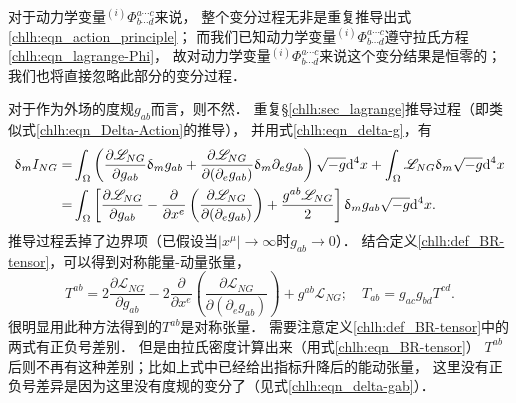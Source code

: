 对于动力学变量${}^{(i)}\Phi^{a\cdots c}_{b\cdots d}$来说，
整个变分过程无非是重复推导出式\eqref{chlh:eqn_action_principle}；
而我们已知动力学变量${}^{(i)}\Phi^{a\cdots c}_{b\cdots d}$遵守拉氏方程\eqref{chlh:eqn_lagrange-Phi}，
故对动力学变量${}^{(i)}\Phi^{a\cdots c}_{b\cdots d}$来说这个变分结果是恒零的；
我们也将直接忽略此部分的变分过程．


对于作为外场的度规$g_{ab}$而言，则不然．
重复\S\ref{chlh:sec_lagrange}推导过程（即类似式\eqref{chlh:eqn_Delta-Action}的推导），
并用式\eqref{chlh:eqn_delta-g}，有
\setlength{\mathindent}{0em}
\begin{align}
    \updelta_{m} I_{NG} =& \int_\Omega
    \left( \frac{\partial \mathscr{L}_{NG}}{\partial g_{ab}} \updelta_{m} g_{ab}
    + \frac{\partial \mathscr{L}_{NG}}{\partial (\partial_e g_{ab})}
    \updelta_m \partial_e  g_{ab} \right) \sqrt{-g} {\rm d}^{4}x
    +\int_\Omega \mathscr{L}_{NG} \updelta_{m} \sqrt{-g} {\rm d}^{4}x \notag \\
    =& \int_\Omega
    \left[ \frac{\partial \mathscr{L}_{NG}}{\partial g_{ab}}
    - \frac{\partial }{\partial x^e} \left(
    \frac{\partial \mathscr{L}_{NG}}{\partial (\partial_e g_{ab})}  \right)
     + \frac{ g^{ab} \mathscr{L}_{NG}}{2}   \right]
     \updelta_{m} g_{ab} \sqrt{-g} {\rm d}^{4}x .
     \label{chlh:eqn_tmpact}
\end{align} \setlength{\mathindent}{2em}
推导过程丢掉了边界项（已假设当$|x^\mu|\to \infty$时$g_{ab}\to 0$）．
结合定义\eqref{chlh:def_BR-tensor}，可以得到对称能量-动量张量，
\begin{equation}\label{chlh:eqn_BR-tensor}
    T^{ab}  %
    = 2\frac{\partial \mathscr{L}_{NG}}{\partial g_{ab}}
    - 2\frac{\partial }{\partial x^e} \left(
    \frac{\partial \mathscr{L}_{NG}}{\partial (\partial_e g_{ab})}  \right)
    +  g^{ab} \mathscr{L}_{NG} 
    ; \quad    T_{ab} = g_{ac}g_{bd} T^{cd} .
\end{equation}
很明显用此种方法得到的$T^{ab}$是对称张量．
需要注意定义\eqref{chlh:def_BR-tensor}中的两式有正负号差别．
但是由拉氏密度计算出来（用式\eqref{chlh:eqn_BR-tensor}）
$T^{ab}$后则不再有这种差别；比如上式中已经给出指标升降后的能动张量，
这里没有正负号差异是因为这里没有度规的变分了（见式\eqref{chlh:eqn_delta-gab}）．



